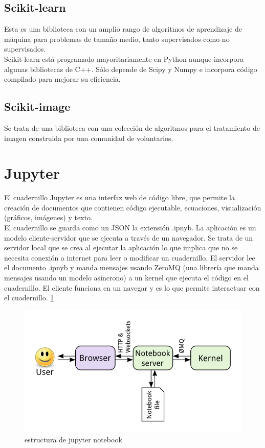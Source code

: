\documentclass[a4paper,12pt]{report}
\begin{document}
\subsection{Scikit-learn}

Esta es una biblioteca con un amplio rango de algoritmos de aprendizaje de máquina para problemas de tamaño medio, tanto supervisados como no supervisados.\\

Scikit-learn está programado mayoritariamente en Python aunque incorpora algunas bibliotecas de C++. Sólo depende de Scipy y Numpy e incorpora código compilado para mejorar su eficiencia.

\subsection{Scikit-image}

Se trata de una biblioteca con una colección de algoritmos para el tratamiento de imagen construida por una comunidad de voluntarios.

\section{Jupyter}

El cuadernillo Jupyter es una interfaz web de código libre, que permite la creación de documentos que contienen código ejecutable, ecuaciones, visualización (gráficos, imágenes) y texto.\\

El cuadernillo se guarda como un JSON la extensión .ipnyb. La aplicación es un modelo cliente-servidor que se ejecuta a través de un navegador. Se trata de un servidor local que se crea al ejecutar la aplicación lo que implica que no se necesita conexión a internet para leer o modificar un cuadernillo.  El servidor lee el documento .ipnyb y manda mensajes usando ZeroMQ (una librería que manda mensajes usando un modelo asíncrono) a un kernel que ejecuta el código en el cuadernillo. El cliente funciona en un navegar y es lo que permite interactuar con el cuadernillo.  	\ref{estructurajupyter}
\begin{figure}[h]
\centering
\includegraphics[width=1.0\textwidth]{imagenes/estructurajupyter}
\caption{estructura de jupyter notebook}
\label{estructurajupyter}
\end{figure}
\end{document}
